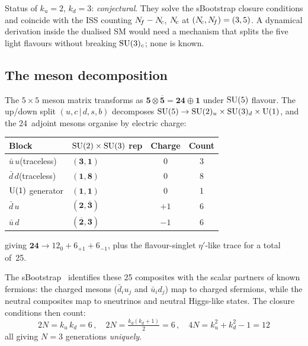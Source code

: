 \documentclass[11pt,a4paper]{article}
\begin{document}
\begin{warningbox}
Status of $k_u = 2$, $k_d = 3$: \emph{conjectural}.  They solve the
sBootstrap closure conditions and coincide with the ISS counting
$N_{\!f}-N_{\!c}$, $N_{\!c}$ at $(N_{\!c},N_{\!f}) = (3,5)$.  A dynamical derivation
inside the dualised SM would need a mechanism that splits the five
light flavours without breaking $\mathrm{SU}(3)_c$; none is known.
\end{warningbox}

\subsection{The meson decomposition}

The $5\times 5$ meson matrix transforms as
$\mathbf{5}\otimes\overline{\mathbf{5}} = \mathbf{24}\oplus\mathbf{1}$
under $\mathrm{SU}(5)$ flavour.  The up/down split $(u,c\,|\,d,s,b)$
decomposes $\mathrm{SU}(5) \to \mathrm{SU}(2)_u \times \mathrm{SU}(3)_d \times \mathrm{U}(1)$, and
the 24~adjoint mesons organise by electric charge:
\begin{center}\small
\begin{tabular}{@{}llcc@{}}
\toprule
Block & $\mathrm{SU}(2)\times\mathrm{SU}(3)$ rep & Charge & Count \\
\midrule
$\bar u\,u$\;(traceless) & $(\mathbf{3},\mathbf{1})$ & $0$ & 3 \\
$\bar d\,d$\;(traceless) & $(\mathbf{1},\mathbf{8})$ & $0$ & 8 \\
$\mathrm{U}(1)$ generator & $(\mathbf{1},\mathbf{1})$ & $0$ & 1 \\
$\bar d\,u$ & $(\mathbf{2},\overline{\mathbf{3}})$ & $+1$ & 6 \\
$\bar u\,d$ & $(\overline{\mathbf{2}},\mathbf{3})$ & $-1$ & 6 \\
\bottomrule
\end{tabular}
\end{center}
giving $\mathbf{24} \to 12_0 + 6_{+1} + 6_{-1}$, plus the
flavour-singlet $\eta'$-like trace for a total of~25.

The sBootstrap~\cite{Rivero2009,Rivero2024} identifies these 25
composites with the scalar partners of known fermions: the charged
mesons ($\bar d_i u_j$ and $\bar u_i d_j$) map to charged
sfermions, while the neutral composites map to sneutrinos and
neutral Higgs-like states.  The closure conditions then
count:
\begin{equation}
  2N = k_u\,k_d = 6\,,\quad
  2N = \tfrac{k_d(k_d+1)}{2} = 6\,,\quad
  4N = k_u^2+k_d^2-1 = 12
\end{equation}
all giving $N = 3$ generations \emph{uniquely}.
\end{document}
